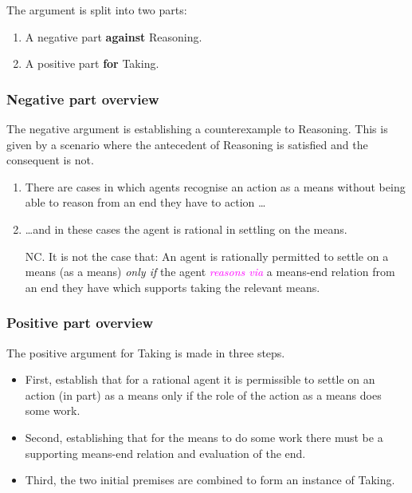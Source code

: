 \documentclass[10pt]{article}
\newcommand{\hozline}[0]{%
  \noindent\hdashrule[0.5ex][c]{\textwidth}{.1pt}{}
}
\newcommand{\hozlinedash}[0]{%
  \noindent\hdashrule[0.5ex][c]{\textwidth}{.1pt}{2.5pt}
}
\newcommand{\schemaName}[1]{\textsf{#1}}
\begin{document}
The argument is split into two parts:
\begin{enumerate}[label=\roman*., ref=(\roman*)]
\item\label{position:Against} A negative part \textbf{against} \schemaName{Reasoning}.
\item\label{position:For} A positive part \textbf{for} \schemaName{Taking}.
\end{enumerate}

\hozline

\subsubsection{Negative part overview}
\label{sec:negat-part-overv}

The negative argument is establishing a counterexample to \schemaName{Reasoning}.
This is given by a scenario where the antecedent of \schemaName{Reasoning} is satisfied and the consequent is not.

\hozlinedash

\begin{enumerate}[label=N\arabic*., ref=(N\arabic*)]
\item\label{scenarios:exist} There are cases in which agents recognise an action as a means without being able to reason from an end they have to action \dots
\item\label{scenarios:persmissible} \dots and in these cases the agent is rational in settling on the means.
\item[NC.]\label{scenario:no-reasoning} It is not the case that:
  An agent is rationally permitted to settle on a means (as a means)  \emph{only if} the agent \textcolor{fuchsia}{\emph{reasons via}} a means-end relation from an end they have which supports taking the relevant means.
\end{enumerate}

\hozline

\subsubsection{Positive part overview}
\label{sec:posit-part-overv}

The positive argument for \schemaName{Taking} is made in three steps.
\begin{itemize}[noitemsep]
\item First, establish that for a rational agent it is permissible to settle on an action (in part) as a means only if the role of the action as a means does some work.
\item Second, establishing that for the means to do some work there must be a supporting means-end relation and evaluation of the end.
\item Third, the two initial premises are combined to form an instance of \schemaName{Taking}.
\end{itemize}
\end{document}
